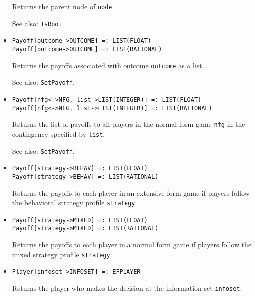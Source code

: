 \begin{itemize}
\bd
Returns the parent node of \verb+node+.
\item
[See also:] {\tt IsRoot}.
\ed

\item
\protect \large \begin{verbatim}
Payoff[outcome->OUTCOME] =: LIST(FLOAT)
Payoff[outcome->OUTCOME] =: LIST(RATIONAL)
\end{verbatim}\normalsize

\bd
Returns the payoffs associated with outcome \verb+outcome+
as a list.
\item
[See also:] {\tt SetPayoff}.
\ed

\item
\protect \large \begin{verbatim}
Payoff[nfg<->NFG, list->LIST(INTEGER)] =: LIST(FLOAT)
Payoff[nfg<->NFG, list->LIST(INTEGER)] =: LIST(RATIONAL)
\end{verbatim}\normalsize

\bd
Returns the list of payoffs to all players in the normal form game
\verb+nfg+ in the contingency specified by \verb+list+.
\item
[See also:] {\tt SetPayoff}.
\ed

\item
\protect \large \begin{verbatim}
Payoff[strategy->BEHAV] =: LIST(FLOAT)
Payoff[strategy->BEHAV] =: LIST(RATIONAL)
\end{verbatim}\normalsize

\bd
Returns the payoffs to each player in an extensive form game
if players follow the behavioral strategy profile \verb+strategy+.
\ed

\item
\protect \large \begin{verbatim}
Payoff[strategy->MIXED] =: LIST(FLOAT)
Payoff[strategy->MIXED] =: LIST(RATIONAL)
\end{verbatim}\normalsize

\bd
Returns the payoffs to each player in a normal form game
if players follow the mixed strategy profile \verb+strategy+.
\ed

\item
\protect \large \begin{verbatim}
Player[infoset->INFOSET] =: EFPLAYER
\end{verbatim}\normalsize

\bd
Returns the player who makes the decision at the information
set \verb+infoset+.
\ed


\end{itemize}
